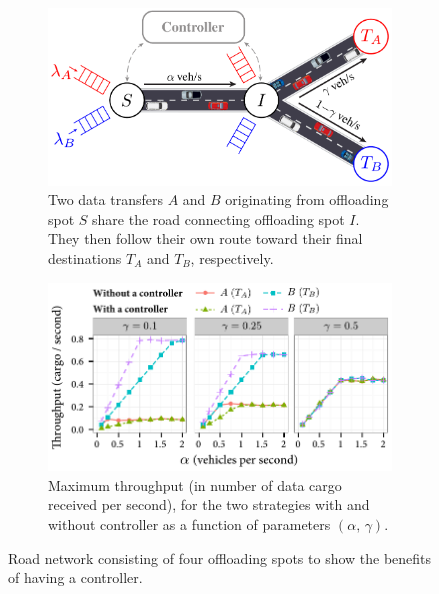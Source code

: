 \begin{figure}[ht]
    \centering
    \begin{subfigure}[t]{0.4\columnwidth}
        \centering
        \includegraphics[width=\textwidth]{figures/simpleScenario.pdf}
        \caption{Two data transfers $A$ and $B$ originating from offloading spot $S$ share the road connecting offloading spot $I$. They then follow their own route toward their final destinations $T_A$ and $T_B$, respectively.}
        \label{fig:simple-scenario}
    \end{subfigure}%
    \quad %
    \begin{subfigure}[t]{0.47\columnwidth}
        \centering
        \includegraphics[width=\textwidth]{results/simpleScenario-throughput_v2_gamma.pdf}
        \caption{Maximum throughput (in number of data cargo received per second), for the two strategies with and without controller as a function of parameters $(\alpha,\,\gamma)$.}
        \label{fig:simple-scenario-throughput}
    \end{subfigure}
    \caption{Road network consisting of four offloading spots to show the benefits of having a controller.}
\end{figure}

